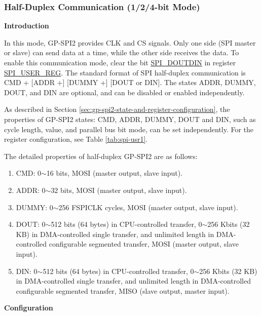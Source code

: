 \documentclass[main\_\_EN.tex]{subfiles}
\begin{document}
\subsubsection{Half-Duplex Communication (1/2/4-bit Mode)}
\label{sec:gp-spi2-1/2/8-bits}

\textbf{Introduction}

In this mode, GP-SPI2 provides CLK and CS signals. Only one side (SPI master or slave) can send data at a time, while the other side receives the data. To enable this communication mode, clear the bit \hyperref[fielddesc:SPIDOUTDIN]{SPI\_DOUTDIN} in register \hyperref[regdesc:SPIUSERREG]{SPI\_USER\_REG}. The standard format of SPI half-duplex communication is CMD + [ADDR +] [DUMMY +] [DOUT or DIN]. The states ADDR, DUMMY, DOUT, and DIN are optional, and can be disabled or enabled independently.

As described in Section \ref{sec:gp-spi2-state-and-register-configuration}, the properties of GP-SPI2 states: CMD, ADDR, DUMMY, DOUT and DIN, such as cycle length, value, and parallel bus bit mode, can be set independently. For the register configuration, see Table \ref{tab:spi-usr1}.

The detailed properties of half-duplex GP-SPI2 are as follows:

\begin{enumerate}
    \item CMD: 0$\sim$16 bits, MOSI (master output, slave input).
    \item ADDR: 0$\sim$32 bits, MOSI (master output, slave input).
    \item DUMMY: 0$\sim$256 FSPICLK cycles, MOSI (master output, slave input).
    \item DOUT: 0$\sim$512 bits (64 bytes) in CPU-controlled transfer, 0$\sim$256 Kbits (32 KB) in DMA-controlled single transfer, and unlimited length in DMA-controlled configurable segmented transfer, MOSI (master output, slave input).
    \item DIN: 0$\sim$512 bits (64 bytes) in CPU-controlled transfer, 0$\sim$256 Kbits (32 KB) in DMA-controlled single transfer, and unlimited length in DMA-controlled configurable segmented transfer, MISO (slave output, master input).
\end{enumerate}

\textbf{Configuration}
\end{document}
